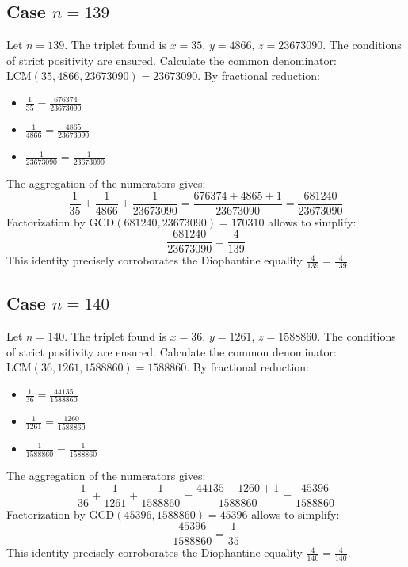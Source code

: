 \documentclass[11pt,a4paper]{article}
\begin{document}
\subsection{Case $n = 139$}
Let $n = 139$. The triplet found is $x = 35$, $y = 4866$, $z = 23673090$.
The conditions of strict positivity are ensured.
Calculate the common denominator: $\text{LCM}(35, 4866, 23673090) = 23673090$.
By fractional reduction:
\begin{itemize}
    \item $\frac{1}{35} = \frac{676374}{23673090}$
    \item $\frac{1}{4866} = \frac{4865}{23673090}$
    \item $\frac{1}{23673090} = \frac{1}{23673090}$
\end{itemize}
The aggregation of the numerators gives:
$$ \frac{1}{35} + \frac{1}{4866} + \frac{1}{23673090} = \frac{676374 + 4865 + 1}{23673090} = \frac{681240}{23673090} $$
Factorization by $\text{GCD}(681240, 23673090) = 170310$ allows to simplify:
$$ \frac{681240}{23673090} = \frac{4}{139} $$
This identity precisely corroborates the Diophantine equality $\frac{4}{139} = \frac{4}{139}$.

\subsection{Case $n = 140$}
Let $n = 140$. The triplet found is $x = 36$, $y = 1261$, $z = 1588860$.
The conditions of strict positivity are ensured.
Calculate the common denominator: $\text{LCM}(36, 1261, 1588860) = 1588860$.
By fractional reduction:
\begin{itemize}
    \item $\frac{1}{36} = \frac{44135}{1588860}$
    \item $\frac{1}{1261} = \frac{1260}{1588860}$
    \item $\frac{1}{1588860} = \frac{1}{1588860}$
\end{itemize}
The aggregation of the numerators gives:
$$ \frac{1}{36} + \frac{1}{1261} + \frac{1}{1588860} = \frac{44135 + 1260 + 1}{1588860} = \frac{45396}{1588860} $$
Factorization by $\text{GCD}(45396, 1588860) = 45396$ allows to simplify:
$$ \frac{45396}{1588860} = \frac{1}{35} $$
This identity precisely corroborates the Diophantine equality $\frac{4}{140} = \frac{4}{140}$.
\end{document}
